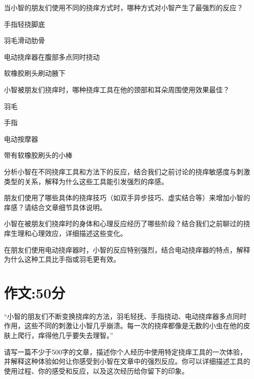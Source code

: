 \documentclass{exam-zh}
\begin{document}
\begin{question}[points = 2]
  当小智的朋友们使用不同的挠痒方式时，哪种方式对小智产生了最强烈的反应？
  \begin{choices}
    \item 手指轻挠脚底
    \item 羽毛滑动肋骨
    \item 电动挠痒器在腹部多点同时挠动
    \item 软橡胶刷头刷动腋下
  \end{choices}
\end{question}

\begin{question}[points = 2]
  小智被朋友们挠痒时，哪种挠痒工具在他的颈部和耳朵周围使用效果最佳？
  \begin{choices}
    \item 羽毛
    \item 手指
    \item 电动按摩器
    \item 带有软橡胶刷头的小棒
  \end{choices}
\end{question}

\begin{problem}[points = 5]分析小智在不同挠痒工具和方法下的反应，结合我们之前讨论的挠痒敏感度与刺激类型的关系，解释为什么这些工具能引发强烈的痒感。\end{problem}

\begin{problem}[points = 5]朋友们使用了哪些具体的挠痒技巧（如双手异步技巧、虚实结合等）来增加小智的痒感？请结合文章细节具体说明。\end{problem}

\begin{problem}[points = 5]  小智在被朋友们挠痒时的身体和心理反应经历了哪些阶段？结合我们之前聊过的挠痒生理和心理效应，详细描述这些变化。\end{problem}

\begin{problem}[points = 5]  在朋友们使用电动挠痒器时，小智的反应特别强烈，结合电动挠痒器的特点，解释为什么这种工具比手指或羽毛更有效。\end{problem}


\section{作文:50分}
\begin{material}
  “小智的朋友们不断变换挠痒的方法，羽毛轻抚、手指挠动、电动挠痒器多点同时作用，这些不同的刺激让小智几乎崩溃。每一次的挠痒都像是无数的小虫在他的皮肤上爬行，痒得他几乎要失去理智。”
\end{material}


\begin{problem}[points = 50] 请写一篇不少于500字的文章，描述你个人经历中使用特定挠痒工具的一次体验，并解释这种体验如何让你感受到小智在文章中的强烈反应。你可以详细描述工具的使用过程、你的感受和反应，以及这次经历给你留下的印象。\end{problem}
\end{document}
